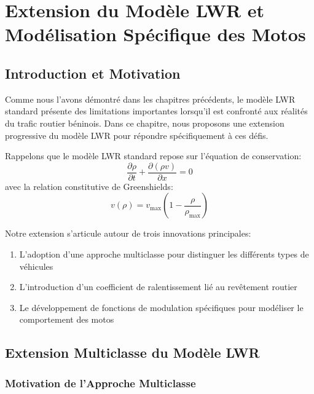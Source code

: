 \chapter{Extension du Modèle LWR et Modélisation Spécifique des Motos}\label{chap:extension_modele}

\section{Introduction et Motivation}\label{sec:intro_motivation}

Comme nous l'avons démontré dans les chapitres précédents, le modèle LWR standard présente des limitations importantes lorsqu'il est confronté aux réalités du trafic routier béninois. Dans ce chapitre, nous proposons une extension progressive du modèle LWR pour répondre spécifiquement à ces défis.

Rappelons que le modèle LWR standard repose sur l'équation de conservation:
\begin{equation}
\frac{\partial \rho}{\partial t} + \frac{\partial(\rho v)}{\partial x} = 0
\end{equation}
avec la relation constitutive de Greenshields:
\begin{equation}
v(\rho) = v_{\max}\left(1 - \frac{\rho}{\rho_{\max}}\right)
\end{equation}

Notre extension s'articule autour de trois innovations principales:
\begin{enumerate}
\item L'adoption d'une approche multiclasse pour distinguer les différents types de véhicules
\item L'introduction d'un coefficient de ralentissement lié au revêtement routier
\item Le développement de fonctions de modulation spécifiques pour modéliser le comportement des motos
\end{enumerate}

\section{Extension Multiclasse du Modèle LWR}\label{sec:extension_multiclasse}

\subsection{Motivation de l'Approche Multiclasse}\label{subsec:motivation_multiclasse}


